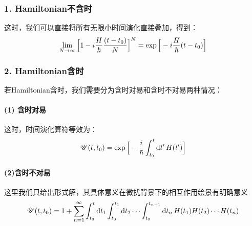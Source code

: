 \subsubsection{1. Hamiltonian不含时}
这时，我们可以直接将所有无限小时间演化直接叠加，得到：
\[
\lim_{N\to\infty}\Big[1 - i\frac{H}{\hbar}\frac{(t-t_{0})}{N}\Big]^{N} = \exp\Big[-i\frac{H}{\hbar}(t-t_{0})\Big]
\]
\subsubsection{2. Hamiltonian含时}
若Hamiltonian含时，我们需要分为含时对易和含时不对易两种情况：
\paragraph{(1) 含时对易}
这时，时间演化算符等效为：
\[
\mathscr{U}(t,t_{0}) = \exp\Big[-\frac{i}{\hbar}\int_{t_{0}}^{t}\dd{t'}H(t')\Big]
\]
\paragraph{(2)含时不对易}
这里我们只给出形式解，其具体意义在微扰背景下的相互作用绘景有明确意义
\[
\mathscr{U}(t,t_{0}) = 1 + \sum_{n=1}^{\infty}\int_{t_{0}}^{t}\dd{t}_{1}\int_{t_{0}}^{t_{1}}\dd{t}_{2}\cdots\int_{t_{0}}^{t_{n-1}}\dd{t}_{n}H(t_{1})H(t_{2})\cdots H(t_{n})
\]

